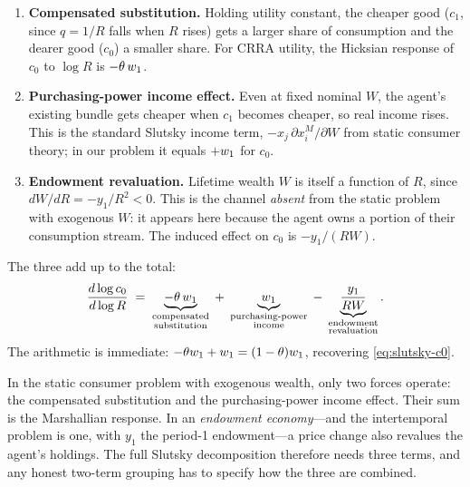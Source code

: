 \begin{enumerate}
\item \textbf{Compensated substitution.} Holding utility constant, the cheaper good ($c_1$, since $q = 1/R$ falls when $R$ rises) gets a larger share of consumption and the dearer good ($c_0$) a smaller share. For CRRA utility, the Hicksian response of $c_0$ to $\log R$ is $-\theta\,w_1$.
\item \textbf{Purchasing-power income effect.} Even at fixed nominal $W$, the agent's existing bundle gets cheaper when $c_1$ becomes cheaper, so real income rises. This is the standard Slutsky income term, $-x_j \,\partial x_i^M / \partial W$ from static consumer theory; in our problem it equals $+w_1$ for $c_0$.
\item \textbf{Endowment revaluation.} Lifetime wealth $W$ is itself a function of $R$, since $dW/dR = -y_1/R^2 < 0$. This is the channel \emph{absent} from the static problem with exogenous $W$: it appears here because the agent owns a portion of their consumption stream. The induced effect on $c_0$ is $-y_1/(RW)$.
\end{enumerate}

The three add up to the total:
\begin{equation}
\frac{d\log c_0}{d\log R} \;=\; \underbrace{-\theta\,w_1}_{\substack{\text{compensated}\\\text{substitution}}} \;+\; \underbrace{w_1}_{\substack{\text{purchasing-power}\\\text{income}}} \;-\; \underbrace{\frac{y_1}{RW}}_{\substack{\text{endowment}\\\text{revaluation}}}.
\label{eq:three-term}
\end{equation}
The arithmetic is immediate: $-\theta w_1 + w_1 = (1-\theta)w_1$, recovering \cref{eq:slutsky-c0}.

\begin{calloutimportant}
In the static consumer problem with exogenous wealth, only two forces operate: the compensated substitution and the purchasing-power income effect. Their sum is the Marshallian response. In an \emph{endowment economy}---and the intertemporal problem is one, with $y_1$ the period-1 endowment---a price change also revalues the agent's holdings. The full Slutsky decomposition therefore needs three terms, and any honest two-term grouping has to specify how the three are combined.
\end{calloutimportant}

